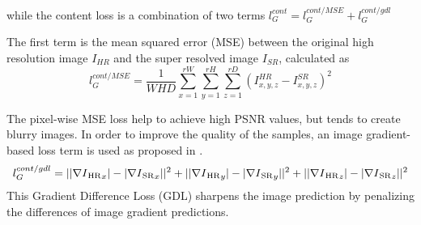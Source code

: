 \documentclass{article}
\begin{document}
while the content loss is a combination of two terms $l_{G}^{cont}= l_G^{cont/MSE} + l_G^{cont/gdl}$

The first term is the mean squared error (MSE) between the original high resolution image $I_{HR}$ and the super resolved image $I_{SR}$, calculated as
\begin{equation}\label{eq:loss_MSE}
	l_{G}^{cont/MSE} = \frac{1}{WHD} \sum_{x=1}^{rW} \sum_{y=1}^{rH}\sum_{z=1}^{rD}(I_{x,y,z}^{HR}-I_{x,y,z}^{SR})^2
\end{equation}

The pixel-wise MSE loss help to achieve high PSNR values, but tends to create blurry images. In order to improve the quality of the samples, an image gradient-based loss term is used as proposed in \cite{couprie:video}.
\begin{equation}\label{eq:loss_gdl}
l_{G}^{cont/gdl} = ||\nabla I\textsubscript{HR}_{x}| - |\nabla I\textsubscript{SR}_{x}||^2 + ||\nabla I\textsubscript{HR}_{y}| - |\nabla I\textsubscript{SR}_{y}||^2 + ||\nabla I\textsubscript{HR}_{z}| - |\nabla I\textsubscript{SR}_{z}||^2
\end{equation}
This Gradient Difference Loss (GDL) sharpens the image prediction by penalizing the differences of image gradient predictions.


\end{document}
